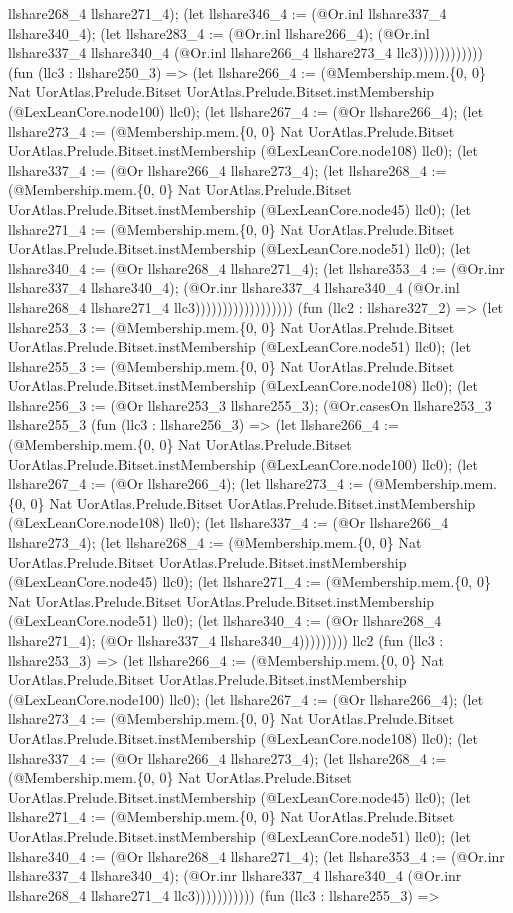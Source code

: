 \documentclass[11pt]{article}
\begin{document}
llshare268\_4 llshare271\_4); (let llshare346\_4 := (@Or.inl llshare337\_4 llshare340\_4); (let llshare283\_4 := (@Or.inl llshare266\_4); (@Or.inl llshare337\_4 llshare340\_4 (@Or.inl llshare266\_4 llshare273\_4 llc3)))))))))))) (fun (llc3 : llshare250\_3) => (let llshare266\_4 := (@Membership.mem.\{0, 0\} Nat UorAtlas.Prelude.Bitset UorAtlas.Prelude.Bitset.instMembership (@LexLeanCore.node100) llc0); (let llshare267\_4 := (@Or llshare266\_4); (let llshare273\_4 := (@Membership.mem.\{0, 0\} Nat UorAtlas.Prelude.Bitset UorAtlas.Prelude.Bitset.instMembership (@LexLeanCore.node108) llc0); (let llshare337\_4 := (@Or llshare266\_4 llshare273\_4); (let llshare268\_4 := (@Membership.mem.\{0, 0\} Nat UorAtlas.Prelude.Bitset UorAtlas.Prelude.Bitset.instMembership (@LexLeanCore.node45) llc0); (let llshare271\_4 := (@Membership.mem.\{0, 0\} Nat UorAtlas.Prelude.Bitset UorAtlas.Prelude.Bitset.instMembership (@LexLeanCore.node51) llc0); (let llshare340\_4 := (@Or llshare268\_4 llshare271\_4); (let llshare353\_4 := (@Or.inr llshare337\_4 llshare340\_4); (@Or.inr llshare337\_4 llshare340\_4 (@Or.inl llshare268\_4 llshare271\_4 llc3)))))))))))))))))) (fun (llc2 : llshare327\_2) => (let llshare253\_3 := (@Membership.mem.\{0, 0\} Nat UorAtlas.Prelude.Bitset UorAtlas.Prelude.Bitset.instMembership (@LexLeanCore.node51) llc0); (let llshare255\_3 := (@Membership.mem.\{0, 0\} Nat UorAtlas.Prelude.Bitset UorAtlas.Prelude.Bitset.instMembership (@LexLeanCore.node108) llc0); (let llshare256\_3 := (@Or llshare253\_3 llshare255\_3); (@Or.casesOn llshare253\_3 llshare255\_3 (fun (llc3 : llshare256\_3) => (let llshare266\_4 := (@Membership.mem.\{0, 0\} Nat UorAtlas.Prelude.Bitset UorAtlas.Prelude.Bitset.instMembership (@LexLeanCore.node100) llc0); (let llshare267\_4 := (@Or llshare266\_4); (let llshare273\_4 := (@Membership.mem.\{0, 0\} Nat UorAtlas.Prelude.Bitset UorAtlas.Prelude.Bitset.instMembership (@LexLeanCore.node108) llc0); (let llshare337\_4 := (@Or llshare266\_4 llshare273\_4); (let llshare268\_4 := (@Membership.mem.\{0, 0\} Nat UorAtlas.Prelude.Bitset UorAtlas.Prelude.Bitset.instMembership (@LexLeanCore.node45) llc0); (let llshare271\_4 := (@Membership.mem.\{0, 0\} Nat UorAtlas.Prelude.Bitset UorAtlas.Prelude.Bitset.instMembership (@LexLeanCore.node51) llc0); (let llshare340\_4 := (@Or llshare268\_4 llshare271\_4); (@Or llshare337\_4 llshare340\_4))))))))) llc2 (fun (llc3 : llshare253\_3) => (let llshare266\_4 := (@Membership.mem.\{0, 0\} Nat UorAtlas.Prelude.Bitset UorAtlas.Prelude.Bitset.instMembership (@LexLeanCore.node100) llc0); (let llshare267\_4 := (@Or llshare266\_4); (let llshare273\_4 := (@Membership.mem.\{0, 0\} Nat UorAtlas.Prelude.Bitset UorAtlas.Prelude.Bitset.instMembership (@LexLeanCore.node108) llc0); (let llshare337\_4 := (@Or llshare266\_4 llshare273\_4); (let llshare268\_4 := (@Membership.mem.\{0, 0\} Nat UorAtlas.Prelude.Bitset UorAtlas.Prelude.Bitset.instMembership (@LexLeanCore.node45) llc0); (let llshare271\_4 := (@Membership.mem.\{0, 0\} Nat UorAtlas.Prelude.Bitset UorAtlas.Prelude.Bitset.instMembership (@LexLeanCore.node51) llc0); (let llshare340\_4 := (@Or llshare268\_4 llshare271\_4); (let llshare353\_4 := (@Or.inr llshare337\_4 llshare340\_4); (@Or.inr llshare337\_4 llshare340\_4 (@Or.inr llshare268\_4 llshare271\_4 llc3))))))))))) (fun (llc3 : llshare255\_3) => 
\end{document}
